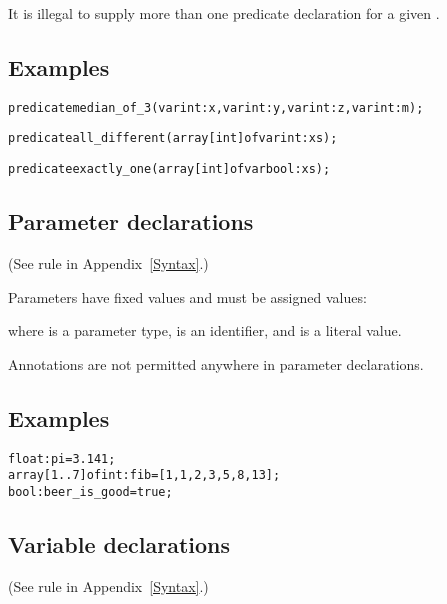 \documentclass[a4paper]{article}
\begin{document}
It is illegal to supply more than one predicate declaration for a given
\fzpredname.

\subsection*{Examples}

\begin{alltt}
    % m is the median value of {x, y, z}.
    %
predicate median_of_3(var int: x, var int: y, var int: z, var int: m);

    % all_different([x1, .., xn]) iff
    % for all i, j in 1..n: xi != xj.
    %
predicate all_different(array [int] of var int: xs);

    % exactly_one([x1, .., xn]) iff
    % there exists an i in 1..n: xi = true
    % and for all j in 1..n: j != i -> xj = false.
    %
predicate exactly_one(array [int] of var bool: xs);
\end{alltt}

\subsection{Parameter declarations}

(See rule  in Appendix~\ref{Syntax}.)

Parameters have fixed values and must be assigned values:

\fz{
\fzparamtype: \fzparamname{} \tt{=} \fzliteral;
}

where \fzparamtype{} is a parameter type, \fzparamname{} is an identifier,
and \fzliteral{} is a literal value.

Annotations are not permitted anywhere in parameter declarations.

\subsection*{Examples}

\begin{alltt}
float: pi = 3.141;
array [1..7] of int: fib = [1, 1, 2, 3, 5, 8, 13];
bool: beer_is_good = true;
\end{alltt}

\subsection{Variable declarations}

(See rule  in Appendix~\ref{Syntax}.)
\end{document}
